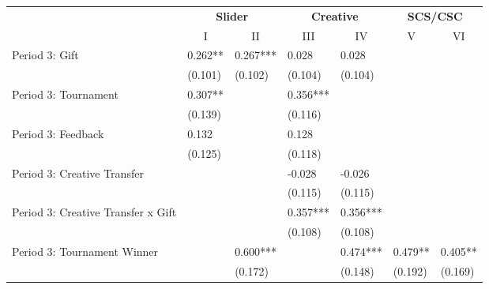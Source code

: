 \documentclass{article}
\begin{document}
\begin{table}[H]%
\begin{center}%
{\small\renewcommand{\arraystretch}{0.9}%
\begin{tabular}{lll|ll|ll}
\hline\hline \noalign{\smallskip}
		&\multicolumn{2}{c}{\textbf{Slider}}&\multicolumn{2}{c}{\textbf{Creative}}&\multicolumn{2}{c}{\textbf{SCS/CSC}}\\
                    &\multicolumn{1}{c}{I}&\multicolumn{1}{c}{II}&\multicolumn{1}{c}{III}&\multicolumn{1}{c}{IV}&\multicolumn{1}{c}{V}&\multicolumn{1}{c}{VI}\\
\hline  \noalign{\smallskip}
Period 3: Gift      &       0.262** &       0.267***&       0.028   &       0.028   &               &               \\
                    &     (0.101)   &     (0.102)   &     (0.104)   &     (0.104)   &               &               \\[2mm]
Period 3: Tournament&       0.307** &               &       0.356***&               &               &               \\
                    &     (0.139)   &               &     (0.116)   &               &               &               \\[2mm]
Period 3: Feedback  &       0.132   &               &       0.128   &               &               &               \\
                    &     (0.125)   &               &     (0.118)   &               &               &               \\[2mm]
Period 3: Creative Transfer&               &               &      -0.028   &      -0.026   &               &               \\
                    &               &               &     (0.115)   &     (0.115)   &               &               \\[2mm]
Period 3: Creative Transfer x Gift&               &               &       0.357***&       0.356***&               &               \\
                    &               &               &     (0.108)   &     (0.108)   &               &               \\[2mm]
Period 3: Tournament Winner&               &       0.600***&               &       0.474***&       0.479** &       0.405** \\
                    &               &     (0.172)   &               &     (0.148)   &     (0.192)   &     (0.169)   \\[2mm]

\end{tabular}}
\end{center}
\end{table}
\end{document}
